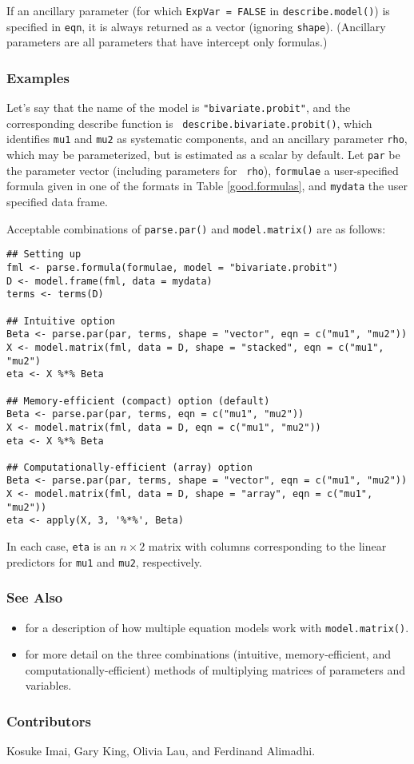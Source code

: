 If an ancillary parameter (for which {\tt ExpVar = FALSE} in
{\tt describe.model()}) is specified in {\tt eqn}, it is
always returned as a vector (ignoring {\tt shape}).  (Ancillary
parameters are all parameters that have intercept only formulas.)  

\subsubsection{Examples}
Let's say that the name of the model is {\tt "bivariate.probit"}, and
the corresponding describe function is {\tt
describe.bivariate.probit()}, which identifies {\tt mu1} and {\tt mu2}
as systematic components, and an ancillary parameter {\tt rho}, which
may be parameterized, but is estimated as a scalar by default.  Let
{\tt par} be the parameter vector (including parameters for {\tt
rho}), {\tt formulae} a user-specified formula given in one of the
formats in Table \ref{good.formulas}, and {\tt mydata} the user
specified data frame.  

Acceptable combinations of {\tt parse.par()} and {\tt model.matrix()}
are as follows:
\begin{verbatim}
## Setting up
fml <- parse.formula(formulae, model = "bivariate.probit")
D <- model.frame(fml, data = mydata)
terms <- terms(D)

## Intuitive option
Beta <- parse.par(par, terms, shape = "vector", eqn = c("mu1", "mu2"))
X <- model.matrix(fml, data = D, shape = "stacked", eqn = c("mu1", "mu2")
eta <- X %*% Beta

## Memory-efficient (compact) option (default)
Beta <- parse.par(par, terms, eqn = c("mu1", "mu2"))    
X <- model.matrix(fml, data = D, eqn = c("mu1", "mu2"))
eta <- X %*% Beta

## Computationally-efficient (array) option
Beta <- parse.par(par, terms, shape = "vector", eqn = c("mu1", "mu2"))
X <- model.matrix(fml, data = D, shape = "array", eqn = c("mu1", "mu2"))
eta <- apply(X, 3, '%*%', Beta)
\end{verbatim}
In each case, {\tt eta} is an $n \times 2$ matrix with columns
corresponding to the linear predictors for {\tt mu1} and {\tt mu2},
respectively.  

\subsubsection{See Also}
\begin{itemize}
\item {} for a description of how multiple
equation models work with {\tt model.matrix()}.  
\item {} for more detail on the three combinations
(intuitive, memory-efficient, and computationally-efficient) methods
of multiplying matrices of parameters and variables.  
\end{itemize}

\subsubsection{Contributors}

Kosuke Imai, Gary King, Olivia Lau, and Ferdinand Alimadhi.

